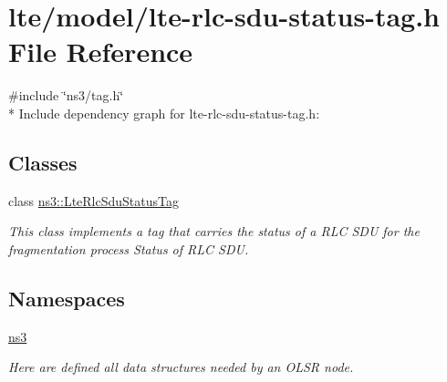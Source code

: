 \hypertarget{lte-rlc-sdu-status-tag_8h}{}\section{lte/model/lte-\/rlc-\/sdu-\/status-\/tag.h File Reference}
\label{lte-rlc-sdu-status-tag_8h}
{\ttfamily \#include \char`\"{}ns3/tag.\+h\char`\"{}}\\*
Include dependency graph for lte-\/rlc-\/sdu-\/status-\/tag.h\+:
\subsection*{Classes}
\begin{DoxyCompactItemize}
\item 
class \hyperlink{classns3_1_1LteRlcSduStatusTag}{ns3\+::\+Lte\+Rlc\+Sdu\+Status\+Tag}
\begin{DoxyCompactList}\small\item\em This class implements a tag that carries the status of a R\+LC S\+DU for the fragmentation process Status of R\+LC S\+DU. \end{DoxyCompactList}\end{DoxyCompactItemize}
\subsection*{Namespaces}
\begin{DoxyCompactItemize}
\item 
 \hyperlink{namespacens3}{ns3}
\begin{DoxyCompactList}\small\item\em Here are defined all data structures needed by an O\+L\+SR node. \end{DoxyCompactList}\end{DoxyCompactItemize}
